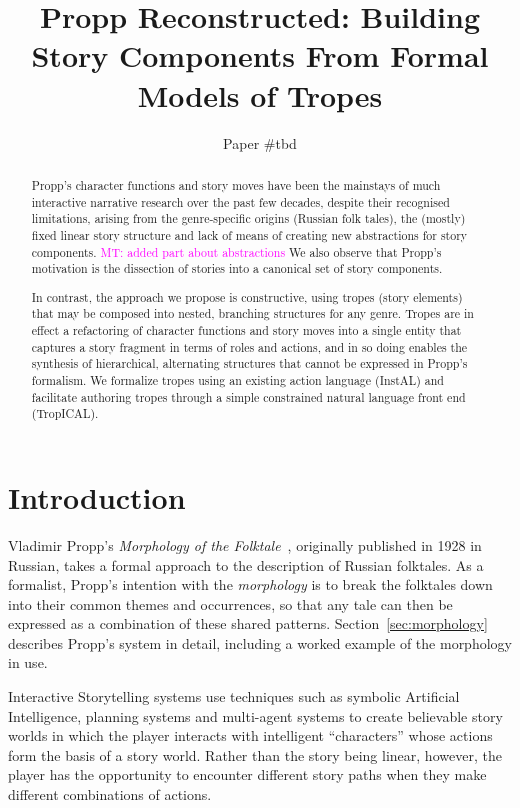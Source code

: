 \documentclass{article}
\title{Propp Reconstructed: Building Story Components From Formal Models of Tropes}
\author{Paper \#tbd}
\newcommand{\mnote}[1]{\textcolor{magenta}{MT: #1}}
\begin{document}
\maketitle

\begin{abstract}
Propp's character functions and story moves have been the mainstays of much
interactive narrative research over the past few decades, despite their
recognised limitations, arising from the genre-specific origins (Russian folk
tales), the (mostly) fixed linear story structure and lack of means of creating
new abstractions for story components. \mnote{added part about abstractions} We also observe that Propp's motivation is the dissection of stories into a canonical set of story components.

In contrast, the approach we propose is constructive, using tropes (story elements) that may be composed into nested, branching structures for any genre. Tropes are in effect a refactoring of character functions and story moves into a single entity that captures a story fragment in terms of roles and actions, and in so doing enables the synthesis of hierarchical, alternating structures that cannot be expressed in Propp's formalism. We formalize tropes using an existing action language (InstAL) and facilitate authoring tropes through a simple constrained natural language front end (TropICAL).
\end{abstract}

\section{Introduction}
Vladimir Propp's \emph{Morphology of the Folktale}~\cite{propp1968morphology},
originally published in 1928 in Russian, takes a formal approach to the
description of Russian folktales. As a formalist, Propp's intention with the
\emph{morphology} is to break the folktales
down into their common themes and occurrences, so that any tale can then be
expressed as a combination of these shared patterns.
Section~\ref{sec:morphology} describes Propp's system in detail, including a
worked example of the morphology in use.

Interactive Storytelling systems use techniques such as symbolic Artificial
Intelligence, planning systems and
multi-agent systems to create believable story worlds in which the player
interacts with intelligent ``characters'' whose actions form the basis of a
story world. Rather than the story being linear, however, the player has the
opportunity to encounter different story paths when they make different
combinations of actions.
\end{document}
